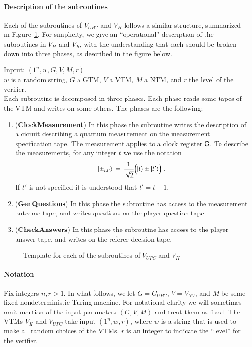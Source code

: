 \paragraph{Description of the subroutines}

Each of the subroutines of $V_{UPC}$ and $V_H$ follows a similar structure, summarized in Figure~\ref{fig:check_structure}. For simplicity, we give an ``operational'' description of the subroutines in $V_H$ and $V_R$, with the understanding that each should be broken down into three phases, as described in the figure below.

\vspace{10pt}
\begin{center}
\begin{mdframed}
Inptut: $(1^n,w,G,V,M,r)$\\
  $w$ is a random string, $G$ a GTM, $V$ a VTM, $M$ a NTM, and $r$ the level of the verifier.\\
Each subroutine is decomposed in three phases. Each phase reads some tapes of the VTM and writes on some others. The phases are the following: 
	\begin{enumerate}
		\item (\textbf{ClockMeasurement}) In this phase the subroutine writes the description of a cicruit describing a quantum measurement on the measurement specification tape. The measurement applies to a clock register ${\mathsf{C}}$. To describe the measurements, for any integer $t$ we use the notation 
$$|\pm_{t,t'}\rangle \,=\, \frac{1}{\sqrt{2}}\big(|t\rangle\pm|t'\rangle\big)\;.$$
If $t'$ is not specified it is understood that $t'=t+1$.
	\item (\textbf{GenQuestions}) In this phase the subroutine has access to the measurement outcome tape, and writes questions on the player question tape. 
	\item (\textbf{CheckAnswers}) In this phase the subroutine has access to the player answer tape, and writes on the referee decision tape. 
	\end{enumerate}    
\end{mdframed}

\end{center}
\begin{figure}[H]
\caption{Template for each of the subroutines of $V_{UPC}$ and $V_H$}
\label{fig:check_structure}
\end{figure}

\paragraph{Notation} 
Fix integers $n, r > 1$. In what follows, we let $G = G_{UPC}$, $V = V_{NV}$, and $M$ be some fixed nondeterministic Turing machine. For notational clarity we will sometimes omit mention of the input parameters $(G,V,M)$ and treat them as fixed. The VTMs $V_H$ and $V_{UPC}$ take input $(1^n,w,r)$, where $w$ is a string that is used to make all random choices of the VTMs. $r$ is an integer to indicate the ``level'' for the verifier. 


